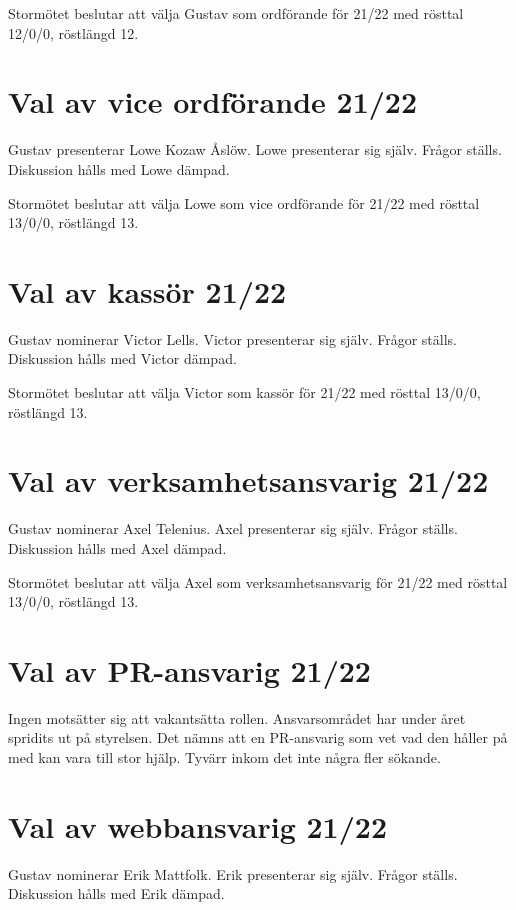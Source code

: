 \documentclass[a4paper]{article}
\begin{document}
Stormötet beslutar att välja Gustav som ordförande för 21/22 med rösttal 12/0/0, röstlängd 12.

\section{Val av vice ordförande 21/22}

Gustav presenterar Lowe Kozaw Åslöw. Lowe presenterar sig själv. Frågor ställs.
Diskussion hålls med Lowe dämpad.

Stormötet beslutar att välja Lowe som vice ordförande för 21/22 med rösttal
13/0/0, röstlängd 13.

\section{Val av kassör 21/22}

Gustav nominerar Victor Lells. Victor presenterar sig själv. Frågor ställs. Diskussion
hålls med Victor dämpad.

Stormötet beslutar att välja Victor som kassör för 21/22 med rösttal 13/0/0, röstlängd 13.

\section{Val av verksamhetsansvarig 21/22}

Gustav nominerar Axel Telenius. Axel presenterar sig själv. Frågor ställs. Diskussion
hålls med Axel dämpad.

Stormötet beslutar att välja Axel som verksamhetsansvarig för 21/22 med rösttal 13/0/0, röstlängd 13.

\section{Val av PR-ansvarig 21/22}

Ingen motsätter sig att vakantsätta rollen. Ansvarsområdet har under året
spridits ut på styrelsen. Det nämns att en PR-ansvarig som vet vad den håller på
med kan vara till stor hjälp. Tyvärr inkom det inte några fler sökande.

\section{Val av webbansvarig 21/22}

Gustav nominerar Erik Mattfolk. Erik presenterar sig själv. Frågor ställs. Diskussion
hålls med Erik dämpad.
\end{document}
